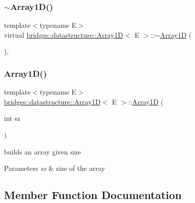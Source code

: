 \subsubsection{\texorpdfstring{$\sim$\+Array1\+D()}{~Array1D()}}
{\footnotesize\ttfamily template$<$typename E$>$ \\
virtual \hyperlink{classbridges_1_1datastructure_1_1_array1_d}{bridges\+::datastructure\+::\+Array1D}$<$ E $>$\+::$\sim$\hyperlink{classbridges_1_1datastructure_1_1_array1_d}{Array1D} (\begin{DoxyParamCaption}{ }\end{DoxyParamCaption})\hspace{0.3cm}{\ttfamily [inline]}, {\ttfamily [virtual]}}

\mbox{\label{classbridges_1_1datastructure_1_1_array1_d_a04e070ed24a1c6e9d200add01ec91c95}} 
\subsubsection{\texorpdfstring{Array1\+D()}{Array1D()}}
{\footnotesize\ttfamily template$<$typename E$>$ \\
\hyperlink{classbridges_1_1datastructure_1_1_array1_d}{bridges\+::datastructure\+::\+Array1D}$<$ E $>$\+::\hyperlink{classbridges_1_1datastructure_1_1_array1_d}{Array1D} (\begin{DoxyParamCaption}\item[{int}]{sz }\end{DoxyParamCaption})\hspace{0.3cm}{\ttfamily [inline]}}



builds an array given size 


\begin{DoxyParams}{Parameters}
{\em sz} & size of the array \\
\hline
\end{DoxyParams}


\subsection{Member Function Documentation}
\mbox{\label{classbridges_1_1datastructure_1_1_array1_d_ad93131c3f7f2e446bedc02d36ac7ddc5}} 
